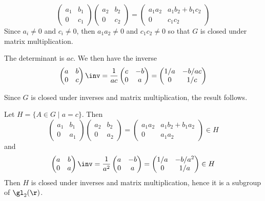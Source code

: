 \begin{solalph}
    \item 
    $$\begin{pmatrix}
        a_1 & b_1 \\
        0 & c_1
    \end{pmatrix}
    \begin{pmatrix}
        a_2 & b_2 \\
        0 & c_2
    \end{pmatrix} = 
    \begin{pmatrix}
        a_1a_2 & a_1b_2 + b_1c_2 \\
        0 & c_1c_2
    \end{pmatrix}$$
    Since $a_i \neq 0$ and $c_i \neq 0$, then $a_1a_2 \neq 0$ and $c_1c_2 \neq 0$ so that $G$ is closed under matrix multiplication.
    \item The determinant is $ac$. We then have the inverse
    $$
    \begin{pmatrix}
        a & b \\
        0 & c
    \end{pmatrix}\inv = 
    \frac{1}{ac}
    \begin{pmatrix}
        c & -b \\
        0 & a
    \end{pmatrix} = 
    \begin{pmatrix}
        1/a & -b/ac \\
        0 & 1/c
    \end{pmatrix}$$
    \item Since $G$ is closed under inverses and matrix multiplication, the result follows.
    \item Let $H = \{A \in G \mid a = c\}$. Then
    $$
    \begin{pmatrix}
        a_1 & b_1 \\
        0 & a_1
    \end{pmatrix}
    \begin{pmatrix}
        a_2 & b_2 \\
        0 & a_2
    \end{pmatrix} = 
    \begin{pmatrix}
        a_1a_2 & a_1b_2 + b_1a_2 \\
        0 & a_1a_2
    \end{pmatrix} \in H$$
    and
    $$
    \begin{pmatrix}
        a & b \\
        0 & a
    \end{pmatrix}\inv = 
    \frac{1}{a^2}
    \begin{pmatrix}
        a & -b \\
        0 & a 
    \end{pmatrix} = 
    \begin{pmatrix}
        1/a & -b/a^2 \\
        0 & 1/a
    \end{pmatrix} \in H$$
    Then $H$ is closed under inverses and matrix multiplication, hence it is a subgroup of $\gl_2(\r)$.
\end{solalph}

